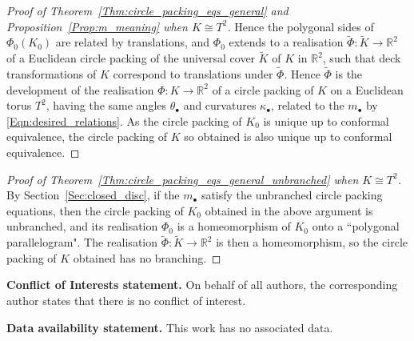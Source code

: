 \documentclass[12pt]{amsart}
\numberwithin{equation}{section}
\theoremstyle{named}
\newcommand{\refsec}[1]{Section~\ref{Sec:#1}}
\newcommand{\refeqn}[1]{\eqref{Eqn:#1}}
\newcommand{\refprop}[1]{Proposition~\ref{Prop:#1}}
\newcommand{\refthm}[1]{Theorem~\ref{Thm:#1}}
\newcommand{\R}{\mathbb{R}}
\newcommand{\To}{\longrightarrow}
\begin{document}
\begin{proof}[ Proof of \refthm{circle_packing_eqs_general} and \refprop{m_meaning} when $K \cong T^2$]
Hence the polygonal sides of $\Phi_0 (K_0)$ are related by translations, and $\Phi_0$ extends to a realisation $\widetilde{\Phi} \colon \widetilde{K} \To \R^2$ of a Euclidean circle packing of the universal cover $\widetilde{K}$ of $K$ in $\R^2$, such that deck transformations of $K$ correspond to translations under $\widetilde{\Phi}$. Hence $\widetilde{\Phi}$ is the development of the realisation $\Phi \colon K \To \R^2$ of a circle packing of $K$ on a Euclidean torus $T^2$, having the same angles $\theta_\bullet$ and curvatures $\kappa_\bullet$, related to the $m_\bullet$ by \refeqn{desired_relations}. As the circle packing of $K_0$ is unique up to conformal equivalence, the circle packing of $K$ so obtained is also unique up to conformal equivalence.
\end{proof}

\begin{proof}[Proof of \refthm{circle_packing_eqs_general_unbranched} when $K \cong T^2$]
By \refsec{closed_disc}, if the $m_\bullet$ satisfy the unbranched circle packing equations, then the circle packing of $K_0$ obtained in the above argument is unbranched, and its realisation $\Phi_0$ is a homeomorphism of $K_0$ onto a ``polygonal parallelogram". The realisation $\widetilde{\Phi} \colon \widetilde{K} \To \R^2$ is then a homeomorphism, so the circle packing of $K$ obtained has no branching.
\end{proof}



{\flushleft \textbf{Conflict of Interests statement.} }
On behalf of all authors, the corresponding author states that there is no conflict of interest. 

{\flushleft \textbf{Data availability statement.} }
This work has no associated data.




\end{document}
